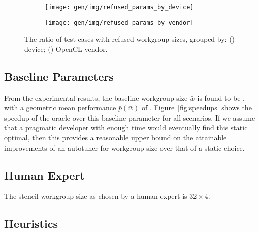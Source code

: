\begin{figure}
\centering
\begin{subfigure}[h]{.45\textwidth}
  \centering
  \texttt{[image: gen/img/refused\_params\_by\_device]}
  \caption{}
  \label{fig:refused-params-by-device}
\end{subfigure}
\hfill
\begin{subfigure}[h]{.45\textwidth}
  \centering
  \texttt{[image: gen/img/refused\_params\_by\_vendor]}
  \caption{}
  \label{fig:refused-params-by-vendor}
\end{subfigure}
\caption{%
  The ratio of test cases with refused workgroup sizes, grouped by:
  () device;
  () OpenCL vendor.%
}
\label{fig:refused-params-by-dev-vendor}
\end{figure}



\subsection{Baseline Parameters}

From the experimental results, the baseline workgroup size $\bar{w}$
is found to be , with a geometric mean performance
$\bar{p}(\bar{w})$ of
. Figure~\ref{fig:speedups} shows the speedup of
the oracle over this baseline parameter for all scenarios. If we
assume that a pragmatic developer with enough time would eventually
find this static optimal, then this provides a reasonable upper bound
on the attainable improvements of an autotuner for workgroup size over
that of a static choice.


\subsection{Human Expert}


The stencil workgroup size as chosen by a human expert is
$32 \times 4$.




\subsection{Heuristics}

